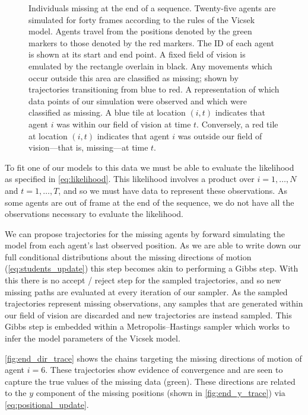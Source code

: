 \begin{figure}[tbp]
\begin{subfigure}[b]{0.5\textwidth}
    \caption{}
    \label{subfig:end_missing}
  \end{subfigure}
  \caption{Individuals missing at the end of a sequence.
   Twenty-five agents are simulated for forty frames
  according to the rules of the Vicsek model. Agents travel from the positions
  denoted by the green markers to those denoted by the red markers. The ID of
  each agent is shown at its start and end point. A fixed field of vision is
  emulated by the rectangle overlain in black. Any movements which occur
  outside this area are classified as missing; shown by trajectories
  transitioning from blue to red.
   A representation of which data points of our
  simulation were observed and which were classified as missing. A blue tile at
  location $(i, t)$ indicates that agent $i$ was within our field of vision at
  time $t$. Conversely, a red tile at location $(i, t)$ indicates that agent
  $i$ was outside our field of vision---that is, missing---at time $t$.}
  \label{fig:end_data}
\end{figure}

To fit one of our models to this data we must be able to evaluate the
likelihood as specified in \cref{eq:likelihood}. This likelihood involves a
product over $i=1,\ldots,N$ and $t=1,\ldots,T$, and so we must have data to
represent these observations. As some agents are out of frame at the end of the
sequence, we do not have all the observations necessary to evaluate the
likelihood.

We can propose trajectories for the missing agents by forward simulating the
model from each agent's last observed position. As we are able to write down
our full conditional distributions about the missing directions of motion
(\cref{eq:students_update}) this step becomes akin to performing a Gibbs step.
With this there is no accept / reject step for the sampled trajectories, and so
new missing paths are evaluated at every iteration of our sampler. As the
sampled trajectories represent missing observations, any samples that are
generated within our field of vision are discarded and new trajectories are
instead sampled. This Gibbs step is embedded within a Metropolis--Hastings
sampler which works to infer the model parameters of the Vicsek model.

\cref{fig:end_dir_trace} shows the chains targeting the missing directions of
motion of agent $i=6$. These trajectories show evidence of convergence and are
seen to capture the true values of the missing data (green). These directions
are related to the $y$ component of the missing positions (shown in
\cref{fig:end_y_trace}) via \cref{eq:positional_update}.

